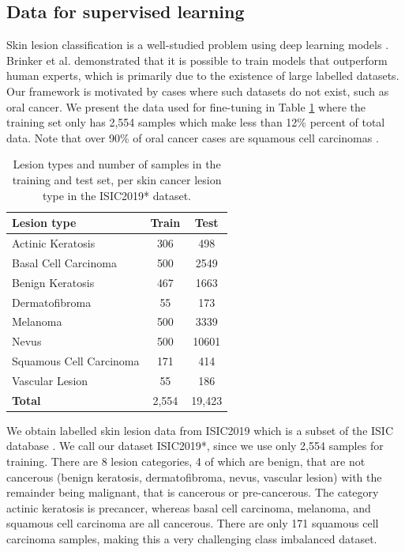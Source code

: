 \documentclass[a4paper,fleqn]{cas-dc}
\begin{document}
\subsection{Data for supervised learning}
Skin lesion classification is a well-studied problem using deep learning models \cite{
mahbod2019skin,zhang2019attention,lopez2017skin}. Brinker et al. \cite{brinker2019deep} demonstrated that it is possible to train models that outperform human experts, which is primarily due to the existence of large labelled datasets. Our framework is motivated by cases where such datasets do not exist, such as oral cancer. We present the data used for fine-tuning in Table \ref{tab:isic_data} where the training set only has 2,554 samples which make less than 12\% percent of total data. Note that over 90\% of oral cancer cases are squamous cell carcinomas \cite{warnakulasuriya2009global}.

\begin{table}[htbp!]
\centering
\begin{tabular}{lcc}
\toprule
\textbf{Lesion type} & \textbf{Train} & \textbf{Test}\\
\midrule
Actinic Keratosis  & 306 & 498 \\
Basal Cell Carcinoma & 500 & 2549\\
Benign Keratosis & 467 & 1663\\
Dermatofibroma     & 55 & 173\\
Melanoma           & 500 & 3339\\
Nevus              & 500 & 10601\\
Squamous Cell Carcinoma & 171 & 414\\
Vascular Lesion    & 55 & 186\\
\midrule
\textbf{Total}     &  2,554& 19,423\\
\bottomrule
\end{tabular}
\caption{Lesion types and number of samples in the training and test set, per skin cancer lesion type in the ISIC2019* dataset.}
\label{tab:isic_data}
\end{table} We obtain labelled skin lesion data from ISIC2019 \cite{andrewmvd2019isic} which is a subset of the ISIC database \cite{ISIC2023}. We call our dataset ISIC2019*, since we use only 2,554 samples for training. There are 8 lesion categories, 4 of which are benign, that are not cancerous (benign keratosis, dermatofibroma, nevus, vascular lesion) with the remainder being malignant, that is cancerous or pre-cancerous. The category actinic keratosis is precancer, whereas basal cell carcinoma, melanoma, and squamous cell carcinoma  are all cancerous. There are only 171 squamous cell carcinoma samples, making this a very challenging class imbalanced dataset.  
\end{document}
